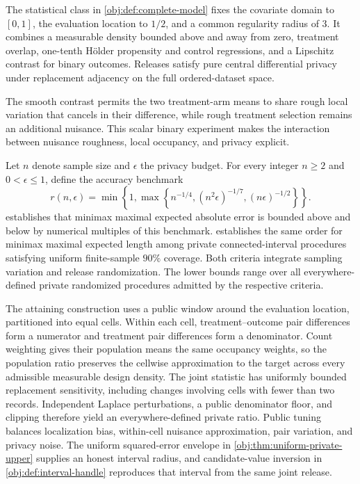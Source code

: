 The statistical class in \cref{obj:def:complete-model} fixes the covariate domain to \([0,1]\), the evaluation location to \(1/2\), and a common regularity radius of \(3\). It combines a measurable density bounded above and away from zero, treatment overlap, one-tenth H\"older propensity and control regressions, and a Lipschitz contrast for binary outcomes. Releases satisfy pure central differential privacy under replacement adjacency on the full ordered-dataset space.

The smooth contrast permits the two treatment-arm means to share rough local variation that cancels in their difference, while rough treatment selection remains an additional nuisance. This scalar binary experiment makes the interaction between nuisance roughness, local occupancy, and privacy explicit.

Let \(n\) denote sample size and \(\epsilon\) the privacy budget. For every integer \(n\ge2\) and \(0<\epsilon\le1\), define the accuracy benchmark
\[
r(n,\epsilon)=
\min\left\{1,\max\left\{
n^{-1/4},(n^2\epsilon)^{-1/7},(n\epsilon)^{-1/2}
\right\}\right\}.
\]
 establishes that minimax maximal expected absolute error is bounded above and below by numerical multiples of this benchmark.  establishes the same order for minimax maximal expected length among private connected-interval procedures satisfying uniform finite-sample \(90\%\) coverage. Both criteria integrate sampling variation and release randomization. The lower bounds range over all everywhere-defined private randomized procedures admitted by the respective criteria.

The attaining construction uses a public window around the evaluation location, partitioned into equal cells. Within each cell, treatment--outcome pair differences form a numerator and treatment pair differences form a denominator. Count weighting gives their population means the same occupancy weights, so the population ratio preserves the cellwise approximation to the target across every admissible measurable design density. The joint statistic has uniformly bounded replacement sensitivity, including changes involving cells with fewer than two records. Independent Laplace perturbations, a public denominator floor, and clipping therefore yield an everywhere-defined private ratio. Public tuning balances localization bias, within-cell nuisance approximation, pair variation, and privacy noise. The uniform squared-error envelope in \cref{obj:thm:uniform-private-upper} supplies an honest interval radius, and candidate-value inversion in \cref{obj:def:interval-handle} reproduces that interval from the same joint release.

